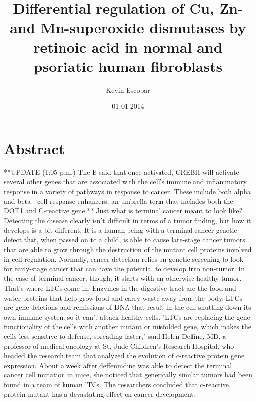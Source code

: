 \documentclass{article}%
\title{Differential regulation of Cu, Zn{-} and Mn{-}superoxide dismutases by retinoic acid in normal and psoriatic human fibroblasts}%
\author{Kevin Escobar}%
\affil{Department of Pediatrics and Molecular and Cellular Oncology, The University of Texas M. D. Anderson Cancer Center, Houston, TX, USA}%
\date{01{-}01{-}2014}%
\begin{document}
%
\normalsize%
\maketitle%
\section{Abstract}%
\label{sec:Abstract}%
**UPDATE (1:05 p.m.) The E said that once activated, CREBH will activate several other genes that are associated with the cell's immune and inflammatory response in a variety of pathways in response to cancer. These include both alpha and beta {-} cell response enhancers, an umbrella term that includes both the DOT1 and C{-}reactive gene.**\newline%
Just what is terminal cancer meant to look like? Detecting the disease clearly isn't difficult in terms of a tumor finding, but how it develops is a bit different.\newline%
It is a human being with a terminal cancer genetic defect that, when passed on to a child, is able to cause late{-}stage cancer tumors that are able to grow through the destruction of the mutant cell proteins involved in cell regulation.\newline%
Normally, cancer detection relies on genetic screening to look for early{-}stage cancer that can have the potential to develop into non{-}tumor. In the case of terminal cancer, though, it starts with an otherwise healthy tumor.\newline%
That's where LTCs come in.\newline%
Enzymes in the digestive tract are the food and water proteins that help grow food and carry waste away from the body. LTCs are gene deletions and remissions of DNA that result in the cell shutting down its own immune system so it can't attack healthy cells.\newline%
"LTCs are replacing the gene functionality of the cells with another mutant or misfolded gene, which makes the cells less sensitive to defense, spreading faster," said Helen Deffine, MD, a professor of medical oncology at St. Jude Children's Research Hospital, who headed the research team that analyzed the evolution of c{-}reactive protein gene expression.\newline%
About a week after deffenmdine was able to detect the terminal cancer cell mutation in mice, she noticed that genetically similar tumors had been found in a team of human lTCs. The researchers concluded that c{-}reactive protein mutant has a devastating effect on cancer development.\newline%
\end{document}
